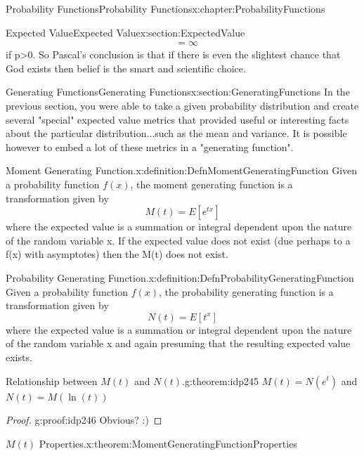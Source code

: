 \documentclass[oneside,10pt,]{book}
\numberwithin{equation}{section}
\begin{document}
\begin{chapterptx}{Probability Functions}{}{Probability Functions}{}{}{x:chapter:ProbabilityFunctions}
\begin{sectionptx}{Expected Value}{}{Expected Value}{}{}{x:section:ExpectedValue}
\begin{align*}
& = \infty
\end{align*}
if p\textgreater{}0. So Pascal's conclusion is that if there is even the slightest chance that God exists then belief is the smart and scientific choice.%
\end{sectionptx}
%
%
\typeout{************************************************}
\typeout{************************************************}
%
\begin{sectionptx}{Generating Functions}{}{Generating Functions}{}{}{x:section:GeneratingFunctions}
In the previous section, you were able to take a given probability distribution and create several "special" expected value metrics that provided useful or interesting facts about the particular distribution...such as the mean and variance. It is possible however to embed a lot of these metrics in a "generating function".%
\begin{definition}{Moment Generating Function.}{x:definition:DefnMomentGeneratingFunction}%
Given a probability function \(f(x)\), the moment generating function is a transformation given by%
\begin{equation*}
M(t) = E[e^{tx}]
\end{equation*}
where the expected value is a summation or integral dependent upon the nature of the random variable x. If the expected value does not exist (due perhaps to a f(x) with asymptotes) then the M(t) does not exist.%
\end{definition}
\begin{definition}{Probability Generating Function.}{x:definition:DefnProbabilityGeneratingFunction}%
Given a probability function \(f(x)\), the probability generating function is a transformation given by%
\begin{equation*}
N(t) = E[t^x]
\end{equation*}
where the expected value is a summation or integral dependent upon the nature of the random variable x and again presuming that the resulting expected value exists.%
\end{definition}
\begin{theorem}{Relationship between \(M(t)\) and \(N(t)\).}{}{g:theorem:idp245}%
\(M(t) = N(e^t)\) and \(N(t) = M(\ln(t))\)\end{theorem}
\begin{proof}{}{g:proof:idp246}
Obvious?  :)%
\end{proof}
\begin{theorem}{\(M(t)\) Properties.}{}{x:theorem:MomentGeneratingFunctionProperties}%

\end{theorem}
\end{sectionptx}
\end{chapterptx}
\end{document}
